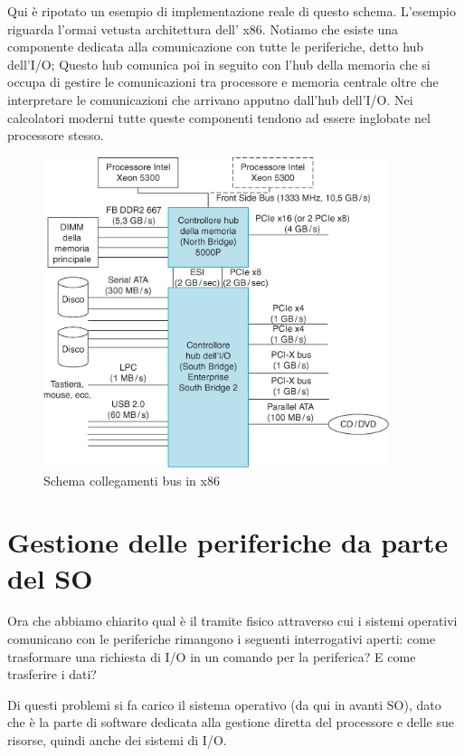 \documentclass[class=book, crop=false, oneside]{standalone}
\begin{document}
Qui è ripotato un esempio di implementazione reale di questo schema. L'esempio riguarda l'ormai vetusta architettura dell' x86.
Notiamo che esiste una componente dedicata alla comunicazione con tutte le periferiche, detto hub dell'I/O; Questo hub comunica poi in seguito con l'hub della memoria che si occupa di gestire le comunicazioni tra processore e memoria centrale oltre che interpretare le comunicazioni che arrivano apputno dall'hub dell'I/O.
Nei calcolatori moderni tutte queste componenti tendono ad essere inglobate nel processore stesso.
\begin{figure}
	\centering
	\includegraphics[width=0.9\textwidth,keepaspectratio]{esempio-x86}
	\caption{Schema collegamenti bus in x86}
\end{figure}

\section{Gestione delle periferiche da parte del SO}
Ora che abbiamo chiarito qual è il tramite fisico attraverso cui i sistemi operativi comunicano con le periferiche rimangono i seguenti interrogativi aperti: come trasformare una richiesta di I/O in un comando per la periferica? E come trasferire i dati?

Di questi problemi si fa carico il sistema operativo (da qui in avanti SO), dato che è la parte di software dedicata alla gestione diretta del processore e delle sue risorse, quindi anche dei sistemi di I/O.
\end{document}
